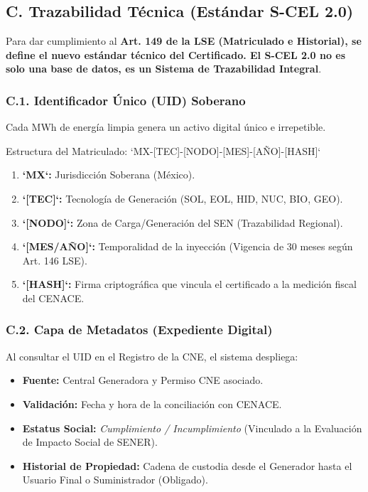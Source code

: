 \documentclass{cel}
\begin{document}
\subsection{C. Trazabilidad Técnica (Estándar S-CEL 2.0)}
\nopagebreak

Para dar cumplimiento al \textbf{Art. 149 de la LSE \textbf{ (Matriculado e Historial), se define el nuevo estándar técnico del Certificado. El S-CEL 2.0 no es solo una base de datos, es un }Sistema de Trazabilidad Integral}.


\subsubsection{C.1. Identificador Único (UID) Soberano}
\nopagebreak

Cada MWh de energía limpia genera un activo digital único e irrepetible.

Estructura del Matriculado: `MX-[TEC]-[NODO]-[MES]-[AÑO]-[HASH]`


\begin{enumerate}
\item \textbf{`MX`:} Jurisdicción Soberana (México).
\item \textbf{`[TEC]`:} Tecnología de Generación (SOL, EOL, HID, NUC, BIO, GEO).
\item \textbf{`[NODO]`:} Zona de Carga/Generación del SEN (Trazabilidad Regional).
\item \textbf{`[MES/AÑO]`:} Temporalidad de la inyección (Vigencia de 30 meses según Art. 146 LSE).
\item \textbf{`[HASH]`:} Firma criptográfica que vincula el certificado a la medición fiscal del CENACE.

\end{enumerate}
\subsubsection{C.2. Capa de Metadatos (Expediente Digital)}
\nopagebreak

Al consultar el UID en el Registro de la CNE, el sistema despliega:


\begin{itemize}
\item \textbf{Fuente:} Central Generadora y Permiso CNE asociado.
\item \textbf{Validación:} Fecha y hora de la conciliación con CENACE.
\item \textbf{Estatus Social:} \textit{Cumplimiento / Incumplimiento} (Vinculado a la Evaluación de Impacto Social de SENER).
\item \textbf{Historial de Propiedad:} Cadena de custodia desde el Generador hasta el Usuario Final o Suministrador (Obligado).

\end{itemize}
\vspace{0.4cm}
\end{document}
